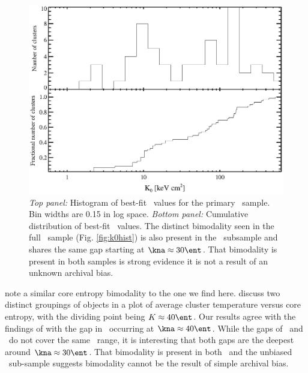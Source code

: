\begin{figure}[htp]
  \begin{center}
    \begin{minipage}[htp]{\linewidth}
      \includegraphics*[width=\textwidth, trim=20mm 10mm 10mm 10mm, clip]{hifl_k0hist}
      \caption[Histogram and cumulative distribution of best-fit
        \kna\ for primary \hifl\ sample.]{{\it{Top panel:}} Histogram
        of best-fit \kna\ values for the primary \hifl\ sample. Bin
        widths are 0.15 in log space.  {\it{Bottom panel:}} Cumulative
        distribution of best-fit \kna\ values. The distinct bimodality
        seen in the full \accept\ sample (Fig. \ref{fig:k0hist}) is
        also present in the \hifl\ subsample and shares the same gap
        starting at $\kna \approx 30 \ent$. That bimodality is present
        in both samples is strong evidence it is not a result of an
        unknown archival bias.}
      \label{fig:hiflk0}
    \end{minipage}
  \end{center}
\end{figure}

\citet{2007hvcg.conf...42H} note a similar core entropy bimodality to
the one we find here. \citet{2007hvcg.conf...42H} discuss two distinct
groupings of objects in a plot of average cluster temperature versus
core entropy, with the dividing point being $K \approx 40 \ent$. Our
results agree with the findings of \citet{2007hvcg.conf...42H} with
the gap in \kna\ occurring at $\kna \approx 40 \ent$. While the gaps
of \accept\ and \hifl\ do not cover the same \kna\ range, it is
interesting that both gaps are the deepest around $\kna \approx 30
\ent$. That bimodality is present in both \accept\ and the unbiased
\hifl\ sub-sample suggests bimodality cannot be the result of simple
archival bias.

